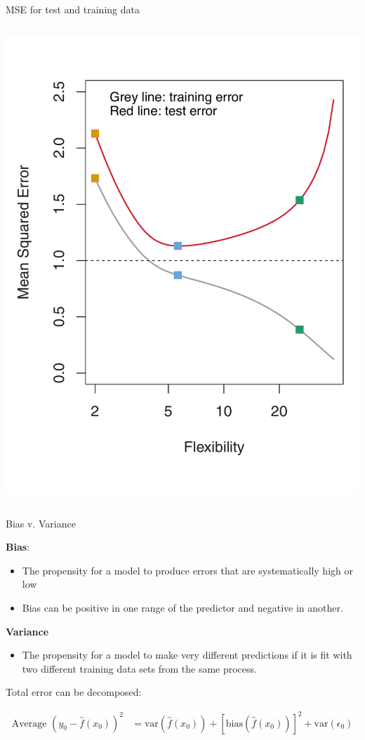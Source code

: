 \documentclass[aspectratio=169, handout]{beamer}
\begin{document}
\begin{frame}{MSE for test and training data}
\begin{columns}
\pause 
\includegraphics[scale=0.25]{figures/islr2_9b.pdf}
\end{columns}


\end{frame}


\begin{frame}{Bias v. Variance}

\textbf{Bias}: 
\begin{itemize}
\item The propensity for a model to produce errors that are systematically high or low
\item Bias can be positive in one range of the predictor and negative in another.  
\end{itemize}


\textbf{Variance}
\begin{itemize}
\item The propensity for a model to make very different predictions if it is fit with two different training data sets from the same process.
\end{itemize}

\hspace{5mm}

Total error can be decomposed:

\begin{align*}
\text{Average }(y_0-\hat{f}(x_0))^2 &=  \text{var} (\hat{f}(x_0)) + [\text{bias}(\hat{f}(x_0))]^2+\text{var}(\epsilon_0)
\end{align*}

\end{frame}
\end{document}
